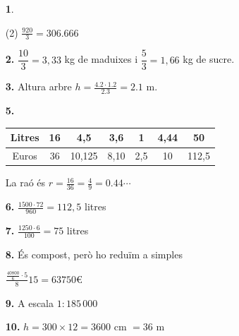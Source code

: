 \documentclass[a4paper, pdf, twoside]{book}
\begin{document}
\begin{multicols}{2}
\begin{enumerate}
 \item[\fontfamily{phv}\selectfont\color{blue}\textbf{1}. ] 
 \begin{tasks}[column-sep=1em, item-indent=1.3333em](2)
	 \task $\frac {920}{3}=306.666$
\end{tasks}
 \end{enumerate}
\begin{enumerate}
\vspace{0.25cm}
\item[\fontfamily{phv}\selectfont\color{blue}\textbf{2. }] 
$\dfrac {10}{3} = 3,33$ kg de maduixes i $\dfrac {5}{3} = 1,66$ kg de sucre.
\vspace{0.25cm}
\item[\fontfamily{phv}\selectfont\color{blue}\textbf{3. }] 
Altura arbre $h=\frac {4.2 \cdot 1.2}{2.3}=2.1$ m.
\vspace{0.25cm}
\item[\fontfamily{phv}\selectfont\color{blue}\textbf{5. }] 
 \begin {tabular}{|c|c|c|c|c|c|c|} \hline Litres & 16 & 4,5 & 3,6& 1 & 4,44 & 50\tabularnewline \hline Euros & 36 &10,125 & 8,10 &2,5 & 10 & 112,5\tabularnewline \hline \end {tabular} \par La raó és $r=\frac {16}{36}=\frac {4}{9}=0.44\cdots $ 
\vspace{0.25cm}
\item[\fontfamily{phv}\selectfont\color{blue}\textbf{6. }] 
$\frac {1500\cdot 72}{960}=112,5$ litres
\vspace{0.25cm}
\item[\fontfamily{phv}\selectfont\color{blue}\textbf{7. }] 
$\frac {1250\cdot 6}{100}=75$ litres
\vspace{0.25cm}
\item[\fontfamily{phv}\selectfont\color{blue}\textbf{8. }] 
És compost, però ho reduïm a simples\par $\frac {\frac {40800}{6} \cdot 5}{8} 15 = 63750 \euro {}$
\vspace{0.25cm}
\item[\fontfamily{phv}\selectfont\color{blue}\textbf{9. }] 
A escala $1:185\,000$
\vspace{0.25cm}
\item[\fontfamily{phv}\selectfont\color{blue}\textbf{10. }] 
$h =300\times 12=3600$ cm $= 36$ m
 \end{enumerate}
\vspace{0.3cm}



\end{multicols}
\end{document}
